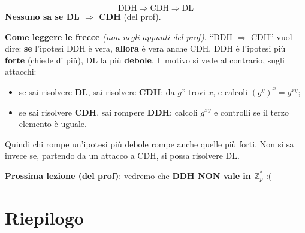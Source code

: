 \[
\text{DDH} \Rightarrow \text{CDH} \Rightarrow \text{DL}
\]
\textbf{Nessuno sa se DL \(\Rightarrow\) CDH} (del prof).

\begin{nota}
\textbf{Come leggere le frecce} \emph{(non negli appunti del prof)}. ``DDH \(\Rightarrow\) CDH'' vuol dire: \textbf{se} l'ipotesi DDH è vera, \textbf{allora} è vera anche CDH. DDH è l'ipotesi più \textbf{forte} (chiede di più), DL la più \textbf{debole}. Il motivo si vede al contrario, sugli attacchi:
\begin{itemize}
  \item se sai risolvere \textbf{DL}, sai risolvere \textbf{CDH}: da \(g^x\) trovi \(x\), e calcoli \((g^y)^x = g^{xy}\);
  \item se sai risolvere \textbf{CDH}, sai rompere \textbf{DDH}: calcoli \(g^{xy}\) e controlli se il terzo elemento è uguale.
\end{itemize}
Quindi chi rompe un'ipotesi più debole rompe anche quelle più forti. Non si sa invece se, partendo da un attacco a CDH, si possa risolvere DL.
\end{nota}

\textbf{Prossima lezione (del prof)}: vedremo che \textbf{DDH NON vale in \(\mathbb{Z}_p^*\)} :(

\section{Riepilogo}

